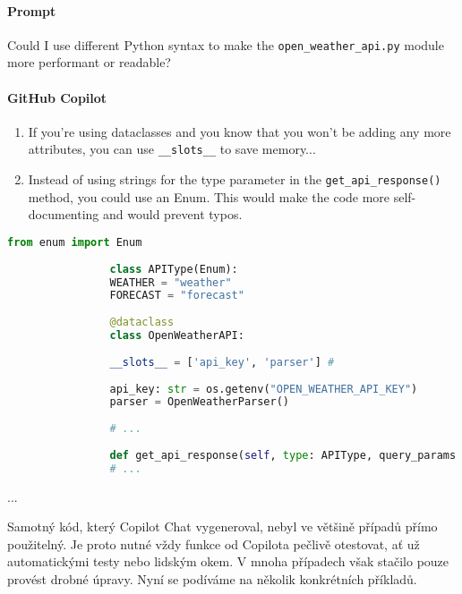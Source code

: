 \documentclass[FM,DP]{tulthesis}
\begin{document}
		\vspace{0.6em}
		\begin{tcolorbox}[colback=white,colframe=black,title=Úprava výkonnosti třídy v Pythonu]
			\paragraph{Prompt}
			
			Could I use different Python syntax to make the \verb|open_weather_api.py| module more performant or readable?
			
			\vspace{0.6em}
			\paragraph{GitHub Copilot}
			\begin{enumerate}
				\item If you're using dataclasses and you know that you won't be adding any more attributes, you can use \verb|__slots__| to save memory...
				\item Instead of using strings for the type parameter in the \verb|get_api_response()| method, you could use an Enum. This would make the code more self-documenting and would prevent typos.
			\end{enumerate}
			
			\vspace{0.6em}
			
			\begin{lstlisting}[language=Python]
				from enum import Enum
				
				class APIType(Enum):
				WEATHER = "weather"
				FORECAST = "forecast"
				
				@dataclass
				class OpenWeatherAPI:
				
				__slots__ = ['api_key', 'parser'] # 
				
				api_key: str = os.getenv("OPEN_WEATHER_API_KEY")
				parser = OpenWeatherParser()
				
				# ...
				
				def get_api_response(self, type: APIType, query_params: dict[str, float | str]) -> dict:
				# ...
			\end{lstlisting}
			... \cite{dataclass}
		\end{tcolorbox}
		
		Samotný kód, který Copilot Chat vygeneroval, nebyl ve většině případů přímo použitelný. Je proto nutné vždy funkce od Copilota pečlivě otestovat, ať už automatickými testy nebo lidským okem. V mnoha případech však stačilo pouze provést drobné úpravy. Nyní se podíváme na několik konkrétních příkladů.
		
\end{document}

